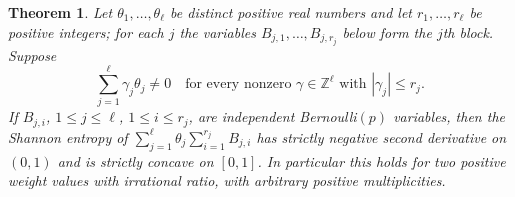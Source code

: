 \documentclass[11pt,a4paper]{article}
\numberwithin{equation}{section}
\newtheorem{theorem}{Theorem}[section]
\theoremstyle{remark}
\newcommand{\Z}{\mathbb Z}
\begin{document}
\begin{theorem}\label{thm:blocks}
Let $\theta_1,\ldots,\theta_\ell$ be distinct positive real numbers and let $r_1,\ldots,r_\ell$ be positive integers; for each $j$ the variables $B_{j,1},\ldots,B_{j,r_j}$ below form the $j$th \emph{block}. Suppose
\begin{equation}\label{eq:injective}
 \sum_{j=1}^{\ell}\gamma_j\theta_j\ne0
 \quad\text{for every nonzero }\gamma\in\Z^\ell
 \text{ with }|\gamma_j|\le r_j.
\end{equation}
If $B_{j,i}$, $1\le j\le\ell$, $1\le i\le r_j$, are independent Bernoulli$(p)$ variables, then the Shannon entropy of
$\sum_{j=1}^{\ell}\theta_j\sum_{i=1}^{r_j}B_{j,i}$ has strictly negative second derivative on $(0,1)$ and is strictly concave on $[0,1]$. In particular this holds for two positive weight values with irrational ratio, with arbitrary positive multiplicities.
\end{theorem}
\end{document}
